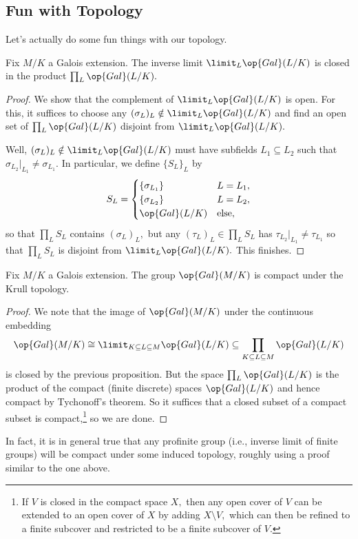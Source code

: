 \subsection{Fun with Topology}
Let's actually do some fun things with our topology.
\begin{proposition} \label{prop:limitclosed}
	Fix $M/K$ a Galois extension. The inverse limit $\limit_L\op{Gal}(L/K)$ is closed in the product $\prod_L\op{Gal}(L/K).$
\end{proposition}
\begin{proof}
	We show that the complement of $\limit_L\op{Gal}(L/K)$ is open. For this, it suffices to choose any $(\sigma_L)_L\notin\limit_L\op{Gal}(L/K)$ and find an open set of $\prod_L\op{Gal}(L/K)$ disjoint from $\limit_L\op{Gal}(L/K).$

	Well, $(\sigma_L)_L\notin\limit_L\op{Gal}(L/K)$ must have subfields $L_1\subseteq L_2$ such that $\sigma_{L_2}|_{L_1}\ne\sigma_{L_1}.$ In particular, we define $\{S_L\}_L$ by
	\[S_L=\begin{cases}
		\{\sigma_{L_1}\} & L=L_1, \\
		\{\sigma_{L_2}\} & L=L_2, \\
		\op{Gal}(L/K) & \text{else},
	\end{cases}\]
	so that $\prod_LS_L$ contains $(\sigma_L)_L,$ but any $(\tau_L)_L\in\prod_LS_L$ has $\tau_{L_2}|_{L_1}\ne\tau_{L_1}$ so that $\prod_LS_L$ is disjoint from $\limit_L\op{Gal}(L/K).$ This finishes.
\end{proof}
\begin{theorem}
	Fix $M/K$ a Galois extension. The group $\op{Gal}(M/K)$ is compact under the Krull topology.
\end{theorem}
\begin{proof}
	We note that the image of $\op{Gal}(M/K)$ under the continuous embedding
	\[\op{Gal}(M/K)\cong\limit_{K\subseteq L\subseteq M}\op{Gal}(L/K)\subseteq\prod_{K\subseteq L\subseteq M}\op{Gal}(L/K)\]
	is closed by the previous proposition. But the space $\prod_L\op{Gal}(L/K)$ is the product of the compact (finite discrete) spaces $\op{Gal}(L/K)$ and hence compact by Tychonoff's theorem. So it suffices that a closed subset of a compact subset is compact,\footnote{If $V$ is closed in the compact space $X,$ then any open cover of $V$ can be extended to an open cover of $X$ by adding $X\setminus V,$ which can then be refined to a finite subcover and restricted to be a finite subcover of $V.$} so we are done.
\end{proof}
\begin{remark}
	In fact, it is in general true that any profinite group (i.e., inverse limit of finite groups) will be compact under some induced topology, roughly using a proof similar to the one above.
\end{remark}
